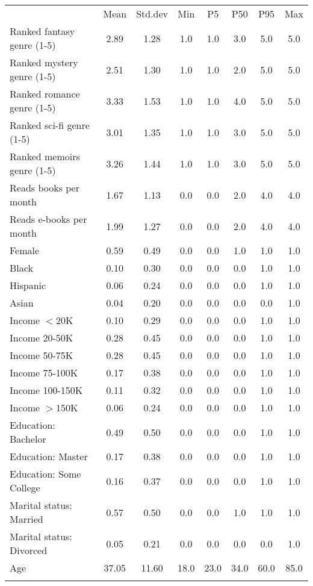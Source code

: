 \begin{center}
\begin{tabular}{lccccccc}
\hline \noalign{\smallskip} & Mean & Std.dev & Min & P5 & P50 & P95 & Max\\
\noalign{\smallskip}\hline \noalign{\smallskip}Ranked fantasy genre (1-5) & 2.89 & 1.28 & 1.0 & 1.0 & 3.0 & 5.0 & 5.0\\
Ranked mystery genre (1-5) & 2.51 & 1.30 & 1.0 & 1.0 & 2.0 & 5.0 & 5.0\\
Ranked romance genre (1-5) & 3.33 & 1.53 & 1.0 & 1.0 & 4.0 & 5.0 & 5.0\\
Ranked sci-fi genre (1-5) & 3.01 & 1.35 & 1.0 & 1.0 & 3.0 & 5.0 & 5.0\\
Ranked memoirs genre (1-5) & 3.26 & 1.44 & 1.0 & 1.0 & 3.0 & 5.0 & 5.0\\
Reads books per month & 1.67 & 1.13 & 0.0 & 0.0 & 2.0 & 4.0 & 4.0\\
Reads e-books per month & 1.99 & 1.27 & 0.0 & 0.0 & 2.0 & 4.0 & 4.0\\
Female & 0.59 & 0.49 & 0.0 & 0.0 & 1.0 & 1.0 & 1.0\\
Black & 0.10 & 0.30 & 0.0 & 0.0 & 0.0 & 1.0 & 1.0\\
Hispanic & 0.06 & 0.24 & 0.0 & 0.0 & 0.0 & 1.0 & 1.0\\
Asian & 0.04 & 0.20 & 0.0 & 0.0 & 0.0 & 0.0 & 1.0\\
Income $<$20K & 0.10 & 0.29 & 0.0 & 0.0 & 0.0 & 1.0 & 1.0\\
Income 20-50K & 0.28 & 0.45 & 0.0 & 0.0 & 0.0 & 1.0 & 1.0\\
Income 50-75K & 0.28 & 0.45 & 0.0 & 0.0 & 0.0 & 1.0 & 1.0\\
Income 75-100K & 0.17 & 0.38 & 0.0 & 0.0 & 0.0 & 1.0 & 1.0\\
Income 100-150K & 0.11 & 0.32 & 0.0 & 0.0 & 0.0 & 1.0 & 1.0\\
Income $>$150K & 0.06 & 0.24 & 0.0 & 0.0 & 0.0 & 1.0 & 1.0\\
Education: Bachelor & 0.49 & 0.50 & 0.0 & 0.0 & 0.0 & 1.0 & 1.0\\
Education: Master & 0.17 & 0.38 & 0.0 & 0.0 & 0.0 & 1.0 & 1.0\\
Education: Some College & 0.16 & 0.37 & 0.0 & 0.0 & 0.0 & 1.0 & 1.0\\
Marital status: Married & 0.57 & 0.50 & 0.0 & 0.0 & 1.0 & 1.0 & 1.0\\
Marital status: Divorced & 0.05 & 0.21 & 0.0 & 0.0 & 0.0 & 0.0 & 1.0\\
Age & 37.05 & 11.60 & 18.0 & 23.0 & 34.0 & 60.0 & 85.0\\
\noalign{\smallskip}\hline\end{tabular}\\
\end{center}
